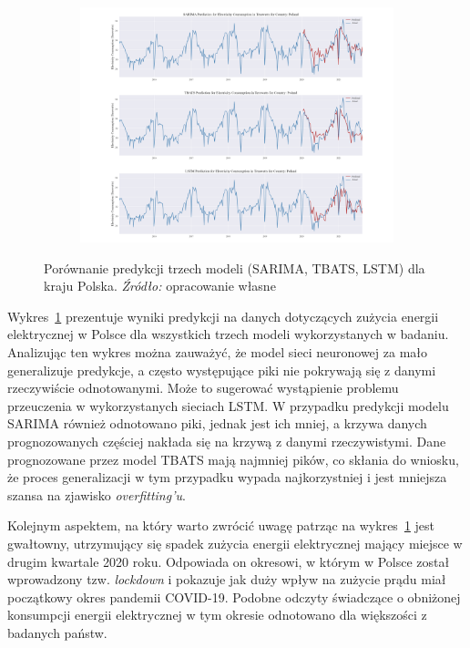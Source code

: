 \documentclass[polish, twoside, 12pt, a4paper]{article}
\theoremstyle{definition}
\theoremstyle{plain}
\theoremstyle{remark}
\begin{document}
\begin{figure}[hbt]
  \centering

  \begin{subfigure}[t]{0.95\textwidth}
    \includegraphics[width=\textwidth]{./out_figures/model_comparison_Poland.png}
  \end{subfigure}

  \captionsetup{margin=10pt,font=small,labelfont=bf,width=.8\textwidth}

  \caption[Porównanie predykcji trzech modeli (SARIMA, TBATS, LSTM) dla kraju Polska.]{Porównanie predykcji trzech modeli (SARIMA, TBATS, LSTM) dla kraju Polska. \textit{Źródło:} opracowanie własne}\label{fig:x13}
\end{figure}

Wykres~\ref{fig:x13} prezentuje wyniki predykcji na danych dotyczących zużycia energii elektrycznej w Polsce dla wszystkich trzech modeli wykorzystanych w badaniu. Analizując ten wykres można zauważyć, że model sieci neuronowej za mało generalizuje predykcje, a często występujące piki nie pokrywają się z danymi rzeczywiście odnotowanymi. Może to sugerować wystąpienie problemu przeuczenia w wykorzystanych sieciach LSTM. W przypadku predykcji modelu SARIMA również odnotowano piki, jednak jest ich mniej, a krzywa danych prognozowanych częściej nakłada się na krzywą z danymi rzeczywistymi. Dane prognozowane przez model TBATS mają najmniej pików, co skłania do wniosku, że proces generalizacji w tym przypadku wypada najkorzystniej i jest mniejsza szansa na zjawisko \textit{overfitting'u}. 

Kolejnym aspektem, na który warto zwrócić uwagę patrząc na wykres~\ref{fig:x13} jest gwałtowny, utrzymujący się spadek zużycia energii elektrycznej mający miejsce w drugim kwartale 2020 roku. Odpowiada on okresowi, w którym w Polsce został wprowadzony tzw. \textit{lockdown} i pokazuje jak duży wpływ na zużycie prądu miał początkowy okres pandemii COVID-19. Podobne odczyty świadczące o obniżonej konsumpcji energii elektrycznej w tym okresie odnotowano dla większości z badanych państw. 
\end{document}
